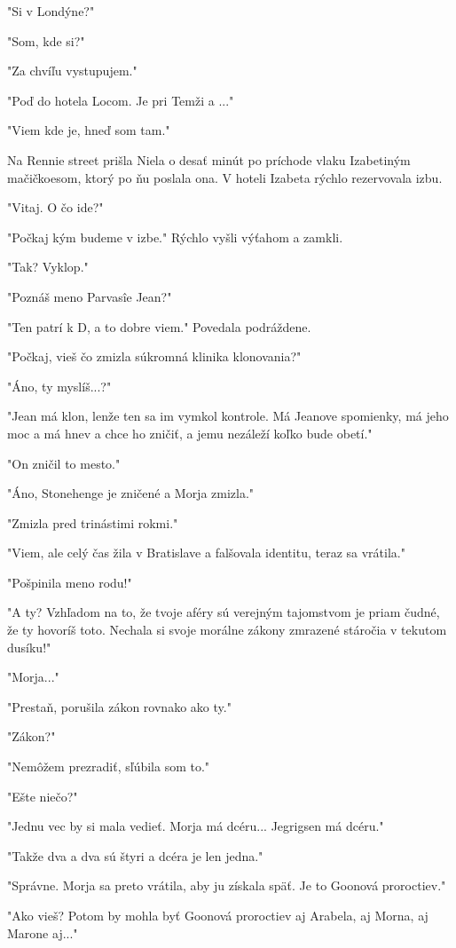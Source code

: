 \documentclass{book}
\begin{document}
"$ $Si v Londýne?"

"$ $Som, kde si?"

"$ $Za chvíľu vystupujem."

"$ $Poď do hotela Locom. Je pri Temži a ..."

"$ $Viem kde je, hneď som tam."

Na Rennie street prišla Niela o desať minút po príchode vlaku Izabetiným mačičkoesom, ktorý po ňu poslala ona. V hoteli Izabeta rýchlo rezervovala izbu.

"$ $Vitaj. O čo ide?"

"$ $Počkaj kým budeme v izbe."$ $ Rýchlo vyšli výťahom a zamkli.

"$ $Tak? Vyklop."

"$ $Poznáš meno Parvasîe Jean?"

"$ $Ten patrí k D, a to dobre viem."$ $ Povedala podráždene.

"$ $Počkaj, vieš čo zmizla súkromná klinika klonovania?"

"$ $Áno, ty myslíš...?"

"$ $Jean má klon, lenže ten sa im vymkol kontrole. Má Jeanove spomienky, má jeho moc a má hnev a chce ho zničiť, a jemu nezáleží koľko bude obetí."

"$ $On zničil to mesto."

"$ $Áno, Stonehenge je zničené a Morja zmizla."

"$ $Zmizla pred trinástimi rokmi."

"$ $Viem, ale celý čas žila v Bratislave a falšovala identitu, teraz sa vrátila."

"$ $Pošpinila meno rodu!"

"$ $A ty? Vzhľadom na to, že tvoje aféry sú verejným tajomstvom je priam čudné, že ty hovoríš toto. Nechala si svoje morálne zákony zmrazené stáročia v tekutom dusíku!"

"$ $Morja..."

"$ $Prestaň, porušila zákon rovnako ako ty."

"$ $Zákon?"

"$ $Nemôžem prezradiť, sľúbila som to."

"$ $Ešte niečo?"

"$ $Jednu vec by si mala vedieť. Morja má dcéru... Jegrigsen má dcéru."

"$ $Takže dva a dva sú štyri a dcéra je len jedna."

"$ $Správne. Morja sa preto vrátila, aby ju získala späť. Je to Goonová proroctiev."

"$ $Ako vieš? Potom by mohla byť Goonová proroctiev aj Arabela, aj Morna, aj Marone aj..."
\end{document}
